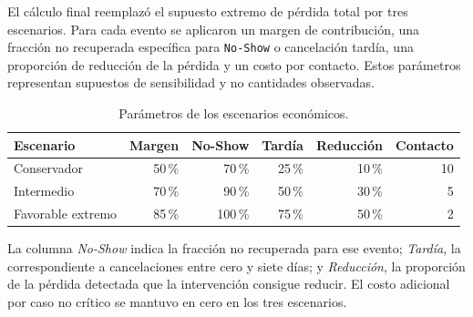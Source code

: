 El cálculo final reemplazó el supuesto extremo de pérdida total por tres
escenarios. Para cada evento se aplicaron un margen de contribución, una
fracción no recuperada específica para \texttt{No-Show} o cancelación tardía,
una proporción de reducción de la pérdida y un costo por contacto. Estos
parámetros representan supuestos de sensibilidad y no cantidades observadas.

\begin{table}[htbp]
    \centering
    \small
    \caption{Parámetros de los escenarios económicos.}
    \label{tab:economic-scenario-parameters}
    \begin{tabular}{lrrrrr}
        \toprule
        Escenario & Margen & No-Show & Tardía & Reducción & Contacto \\
        \midrule
        Conservador & 50\,\% & 70\,\% & 25\,\% & 10\,\% & 10 \\
        Intermedio & 70\,\% & 90\,\% & 50\,\% & 30\,\% & 5 \\
        Favorable extremo & 85\,\% & 100\,\% & 75\,\% & 50\,\% & 2 \\
        \bottomrule
    \end{tabular}
\end{table}

La columna \emph{No-Show} indica la fracción no recuperada para ese evento;
\emph{Tardía}, la correspondiente a cancelaciones entre cero y siete días;
y \emph{Reducción}, la proporción de la pérdida detectada que la intervención
consigue reducir. El costo adicional por caso no crítico se mantuvo en cero en
los tres escenarios.

